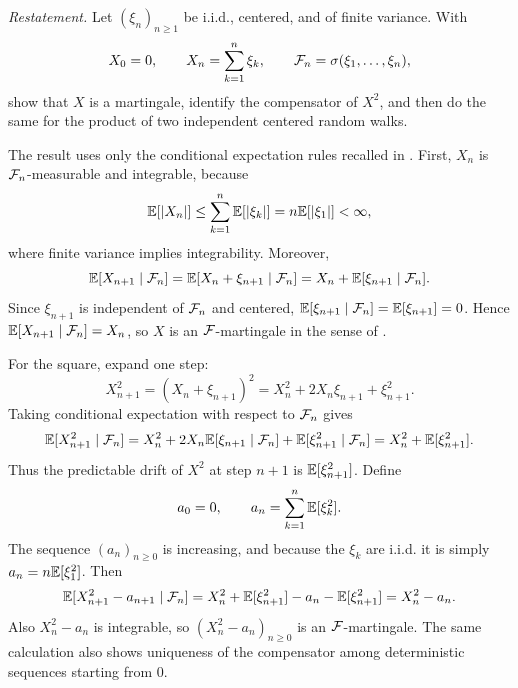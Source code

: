 \begin{exercise}
\emph{Restatement.}  Let \((\xi_n)_{n\ge 1}\) be i.i.d., centered, and of
finite variance.  With
\[
  X_0=0,\qquad X_n=\sum_{k=1}^n \xi_k,
  \qquad
  \mathcal{F}_n=\sigma(\xi_1,\ldots,\xi_n),
\]
show that \(X\) is a martingale, identify the compensator of \(X^2\), and
then do the same for the product of two independent centered random walks.
\end{exercise}

\begin{solution}
The result uses only the conditional expectation rules recalled in
.  First, \(X_n\) is \(\mathcal{F}_n\)-measurable and integrable,
because
\[
  \mathbb{E}[|X_n|]\le \sum_{k=1}^n \mathbb{E}[|\xi_k|]
  =n\mathbb{E}[|\xi_1|]<\infty,
\]
where finite variance implies integrability.  Moreover,
\[
  \mathbb{E}[X_{n+1}\mid \mathcal{F}_n]
    =\mathbb{E}[X_n+\xi_{n+1}\mid \mathcal{F}_n]
    =X_n+\mathbb{E}[\xi_{n+1}\mid \mathcal{F}_n].
\]
Since \(\xi_{n+1}\) is independent of \(\mathcal{F}_n\) and centered,
\(\mathbb{E}[\xi_{n+1}\mid \mathcal{F}_n]=\mathbb{E}[\xi_{n+1}]=0\).  Hence
\(\mathbb{E}[X_{n+1}\mid \mathcal{F}_n]=X_n\), so \(X\) is an \(\mathcal{F}\)-martingale in the sense of
.

For the square, expand one step:
\[
  X_{n+1}^2=(X_n+\xi_{n+1})^2
    =X_n^2+2X_n\xi_{n+1}+\xi_{n+1}^2.
\]
Taking conditional expectation with respect to \(\mathcal{F}_n\) gives
\[
  \mathbb{E}[X_{n+1}^2\mid \mathcal{F}_n]
    =X_n^2+2X_n\mathbb{E}[\xi_{n+1}\mid \mathcal{F}_n]
      +\mathbb{E}[\xi_{n+1}^2\mid \mathcal{F}_n]
    =X_n^2+\mathbb{E}[\xi_{n+1}^2].
\]
Thus the predictable drift of \(X^2\) at step \(n+1\) is
\(\mathbb{E}[\xi_{n+1}^2]\).  Define
\[
  a_0=0,\qquad a_n=\sum_{k=1}^n \mathbb{E}[\xi_k^2].
\]
The sequence \((a_n)_{n\ge 0}\) is increasing, and because the \(\xi_k\) are
i.i.d. it is simply \(a_n=n\mathbb{E}[\xi_1^2]\).  Then
\[
  \mathbb{E}[X_{n+1}^2-a_{n+1}\mid \mathcal{F}_n]
    =X_n^2+\mathbb{E}[\xi_{n+1}^2]
      -a_n-\mathbb{E}[\xi_{n+1}^2]
    =X_n^2-a_n.
\]
Also \(X_n^2-a_n\) is integrable, so \((X_n^2-a_n)_{n\ge 0}\) is an
\(\mathcal{F}\)-martingale.  The same calculation also shows uniqueness of the
compensator among deterministic sequences starting from \(0\).


\end{solution}
